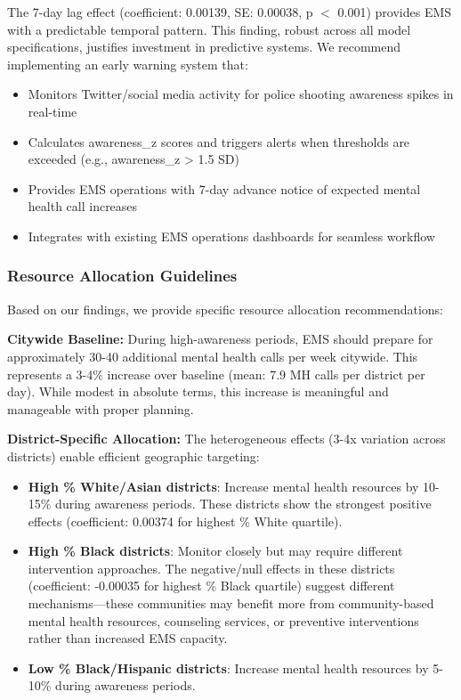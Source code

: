 \documentclass[11pt,a4paper]{article}
\begin{document}
The 7-day lag effect (coefficient: 0.00139, SE: 0.00038, p $<$ 0.001) provides EMS with a predictable temporal pattern. This finding, robust across all model specifications, justifies investment in predictive systems. We recommend implementing an early warning system that:

\begin{itemize}
    \item Monitors Twitter/social media activity for police shooting awareness spikes in real-time
    \item Calculates awareness_z scores and triggers alerts when thresholds are exceeded (e.g., awareness_z > 1.5 SD)
    \item Provides EMS operations with 7-day advance notice of expected mental health call increases
    \item Integrates with existing EMS operations dashboards for seamless workflow
\end{itemize}

\subsubsection{Resource Allocation Guidelines}

Based on our findings, we provide specific resource allocation recommendations:

\textbf{Citywide Baseline:} During high-awareness periods, EMS should prepare for approximately 30-40 additional mental health calls per week citywide. This represents a 3-4\% increase over baseline (mean: 7.9 MH calls per district per day). While modest in absolute terms, this increase is meaningful and manageable with proper planning.

\textbf{District-Specific Allocation:} The heterogeneous effects (3-4x variation across districts) enable efficient geographic targeting:

\begin{itemize}
    \item \textbf{High \% White/Asian districts}: Increase mental health resources by 10-15\% during awareness periods. These districts show the strongest positive effects (coefficient: 0.00374 for highest \% White quartile).
    \item \textbf{High \% Black districts}: Monitor closely but may require different intervention approaches. The negative/null effects in these districts (coefficient: -0.00035 for highest \% Black quartile) suggest different mechanisms—these communities may benefit more from community-based mental health resources, counseling services, or preventive interventions rather than increased EMS capacity.
    \item \textbf{Low \% Black/Hispanic districts}: Increase mental health resources by 5-10\% during awareness periods.
\end{itemize}
\end{document}
